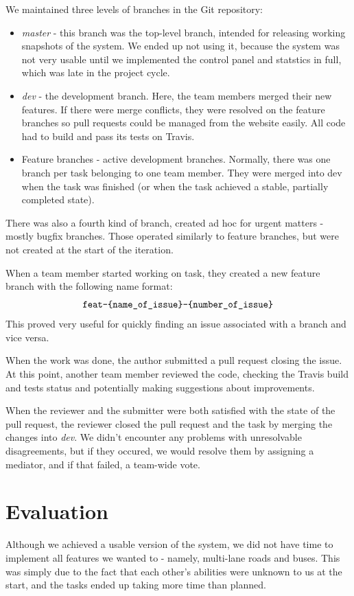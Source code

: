 \documentclass[a4paper,12pt]{article}
\begin{document}
We maintained three levels of branches in the Git repository:
\begin{itemize}
    \item \emph{master} - this branch was the top-level branch, intended for releasing working snapshots of the system. We ended up not using it, because the system was not very usable until we implemented the control panel and statstics in full, which was late in the project cycle.
    \item \emph{dev} - the development branch. Here, the team members merged their new features. If there were merge conflicts, they were resolved on the feature branches so pull requests could be managed from the website easily. All code had to build and pass its tests on Travis.
    \item Feature branches - active development branches. Normally, there was one branch per task belonging to one team member. They were merged into dev when the task was finished (or when the task achieved a stable, partially completed state).
\end{itemize}

There was also a fourth kind of branch, created ad hoc for urgent matters - mostly bugfix branches. Those operated similarly to feature branches, but were not created at the start of the iteration.

When a team member started working on task, they created a new feature branch with the following name format:
$$\verb|feat-{name_of_issue}-{number_of_issue}|$$ This proved very useful for quickly finding an issue associated with a branch and vice versa.

When the work was done, the author submitted a pull request closing the issue. At this point, another team member reviewed the code, checking the Travis build and tests status and potentially making suggestions about improvements.

When the reviewer and the submitter were both satisfied with the state of the pull request, the reviewer closed the pull request and the task by merging the changes into \emph{dev}. We didn't encounter any problems with unresolvable disagreements, but if they occured, we would resolve them by assigning a mediator, and if that failed, a team-wide vote.

\section{Evaluation}

Although we achieved a usable version of the system, we did not have time to implement all features we wanted to - namely, multi-lane roads and buses. This was simply due to the fact that each other's abilities were unknown to us at the start, and the tasks ended up taking more time than planned.
\end{document}
